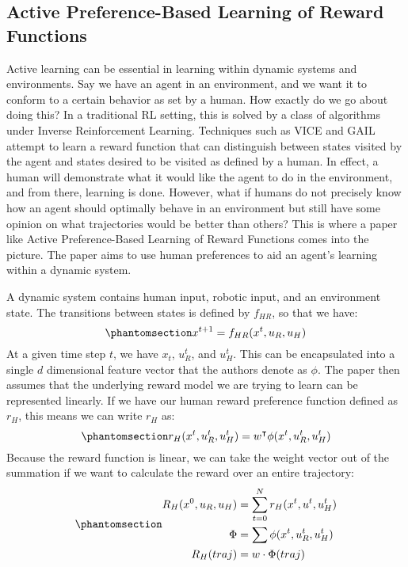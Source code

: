 \documentclass[
  letterpaper,
  numbers=noenddot,
  DIV=11]{scrreprt}
\theoremstyle{definition}
\theoremstyle{plain}
\theoremstyle{plain}
\theoremstyle{remark}
\begin{document}
\subsection{Active Preference-Based Learning of Reward
Functions}\label{active-preference-based-learning-of-reward-functions}

Active learning can be essential in learning within dynamic systems and
environments. Say we have an agent in an environment, and we want it to
conform to a certain behavior as set by a human. How exactly do we go
about doing this? In a traditional RL setting, this is solved by a class
of algorithms under Inverse Reinforcement Learning. Techniques such as
VICE and GAIL attempt to learn a reward function that can distinguish
between states visited by the agent and states desired to be visited as
defined by a human. In effect, a human will demonstrate what it would
like the agent to do in the environment, and from there, learning is
done. However, what if humans do not precisely know how an agent should
optimally behave in an environment but still have some opinion on what
trajectories would be better than others? This is where a paper like
Active Preference-Based Learning of Reward Functions comes into the
picture. The paper aims to use human preferences to aid an agent's
learning within a dynamic system.

A dynamic system contains human input, robotic input, and an environment
state. The transitions between states is defined by \(f_{HR}\), so that
we have:
\begin{equation}\phantomsection\label{eq-eq3.35}{x^{t+1} = f_{HR}(x^t, u_R, u_H)}\end{equation}
At a given time step \(t\), we have \(x_t\), \(u_R^t\), and \(u_H^t\).
This can be encapsulated into a single \(d\) dimensional feature vector
that the authors denote as \(\phi\). The paper then assumes that the
underlying reward model we are trying to learn can be represented
linearly. If we have our human reward preference function defined as
\(r_H\), this means we can write \(r_H\) as:
\begin{equation}\phantomsection\label{eq-eq3.35}{r_H(x^t, u_R^t, u_H^t) = w^{\intercal}\phi(x^t, u_R^t, u_H^t)}\end{equation}
Because the reward function is linear, we can take the weight vector out
of the summation if we want to calculate the reward over an entire
trajectory:
\begin{equation}\phantomsection\label{eq-eq3.36}{\begin{aligned}
R_{H}(x^0, u_R, u_H) &= \sum_{t=0}^{N} r_{H}(x^t, u^t, u_H^t)\\
\Phi &= \sum \phi(x^t, u_R^t, u_H^t)\\ 
R_H(traj) &= w\cdot\Phi(traj)\end{aligned}}\end{equation}
\end{document}
